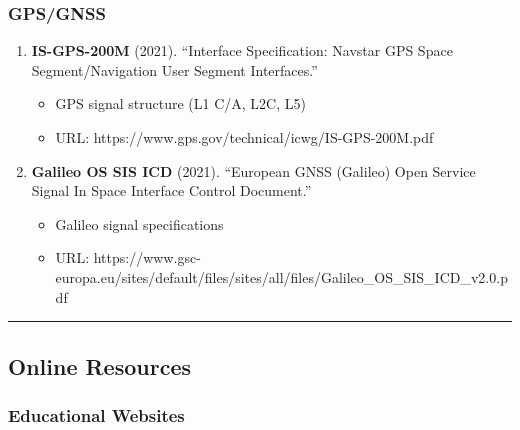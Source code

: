 \subsubsection{GPS/GNSS}\label{gpsgnss}

\begin{enumerate}
\def\labelenumi{\arabic{enumi}.}
\setcounter{enumi}{33}
\tightlist
\item
  \textbf{IS-GPS-200M} (2021). ``Interface Specification: Navstar GPS
  Space Segment/Navigation User Segment Interfaces.''

  \begin{itemize}
  \tightlist
  \item
    GPS signal structure (L1 C/A, L2C, L5)
  \item
    URL: https://www.gps.gov/technical/icwg/IS-GPS-200M.pdf
  \end{itemize}
\item
  \textbf{Galileo OS SIS ICD} (2021). ``European GNSS (Galileo) Open
  Service Signal In Space Interface Control Document.''

  \begin{itemize}
  \tightlist
  \item
    Galileo signal specifications
  \item
    URL:
    https://www.gsc-europa.eu/sites/default/files/sites/all/files/Galileo\_OS\_SIS\_ICD\_v2.0.pdf
  \end{itemize}
\end{enumerate}

\begin{center}\rule{0.5\linewidth}{0.5pt}\end{center}

\subsection{\texorpdfstring{ Online
Resources}{ Online Resources}}\label{online-resources}

\subsubsection{Educational Websites}\label{educational-websites}

